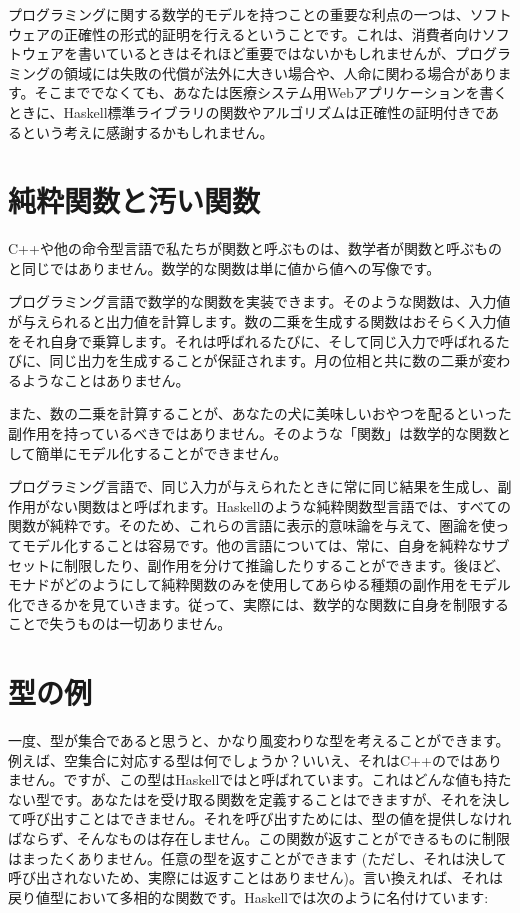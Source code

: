 プログラミングに関する数学的モデルを持つことの重要な利点の一つは、ソフトウェアの正確性の形式的証明を行えるということです。これは、消費者向けソフトウェアを書いているときはそれほど重要ではないかもしれませんが、プログラミングの領域には失敗の代償が法外に大きい場合や、人命に関わる場合があります。そこまででなくても、あなたは医療システム用Webアプリケーションを書くときに、Haskell標準ライブラリの関数やアルゴリズムは正確性の証明付きであるという考えに感謝するかもしれません。

\section{純粋関数と汚い関数}

C++や他の命令型言語で私たちが関数と呼ぶものは、数学者が関数と呼ぶものと同じではありません。数学的な関数は単に値から値への写像です。

プログラミング言語で数学的な関数を実装できます。そのような関数は、入力値が与えられると出力値を計算します。数の二乗を生成する関数はおそらく入力値をそれ自身で乗算します。それは呼ばれるたびに、そして同じ入力で呼ばれるたびに、同じ出力を生成することが保証されます。月の位相と共に数の二乗が変わるようなことはありません。

また、数の二乗を計算することが、あなたの犬に美味しいおやつを配るといった副作用を持っているべきではありません。そのような「関数」は数学的な関数として簡単にモデル化することができません。

プログラミング言語で、同じ入力が与えられたときに常に同じ結果を生成し、副作用がない関数はと呼ばれます。Haskellのような純粋関数型言語では、すべての関数が純粋です。そのため、これらの言語に表示的意味論を与えて、圏論を使ってモデル化することは容易です。他の言語については、常に、自身を純粋なサブセットに制限したり、副作用を分けて推論したりすることができます。後ほど、モナドがどのようにして純粋関数のみを使用してあらゆる種類の副作用をモデル化できるかを見ていきます。従って、実際には、数学的な関数に自身を制限することで失うものは一切ありません。

\section{型の例}

一度、型が集合であると思うと、かなり風変わりな型を考えることができます。例えば、空集合に対応する型は何でしょうか？いいえ、それはC++のではありません。ですが、この型はHaskellではと呼ばれています。これはどんな値も持たない型です。あなたはを受け取る関数を定義することはできますが、それを決して呼び出すことはできません。それを呼び出すためには、型の値を提供しなければならず、そんなものは存在しません。この関数が返すことができるものに制限はまったくありません。任意の型を返すことができます (ただし、それは決して呼び出されないため、実際には返すことはありません)。言い換えれば、それは戻り値型において多相的な関数です。Haskellでは次のように名付けています: 


